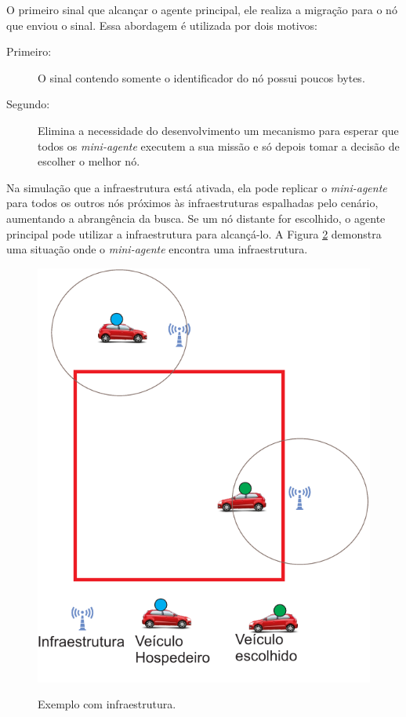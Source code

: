 \begin{figure}[htbp]
\begin{minipage}{0.50\textwidth}
		\label{fig:destinoVeiculoSelecionadoProximoRA}
	\end{minipage}
\end{figure}

O primeiro sinal que alcançar o agente principal, ele realiza a migração para o nó que enviou o sinal. Essa abordagem é utilizada por dois motivos:

\begin{description}
	\item[Primeiro:] O sinal contendo somente o identificador do nó possui poucos bytes.
	\item[Segundo:] Elimina a necessidade do desenvolvimento um mecanismo para esperar que todos os \emph{mini-agente} executem a sua missão e só depois tomar a decisão de escolher o melhor nó.
\end{description}

Na simulação que a infraestrutura está ativada, ela pode replicar o \emph{mini-agente} para todos os outros nós próximos 
às infraestruturas espalhadas pelo cenário, aumentando a abrangência da busca. Se um nó distante for escolhido, o agente principal pode utilizar a infraestrutura para alcançá-lo. A Figura \ref{fig:exemploComInfraestrutura} demonstra uma situação onde o \emph{mini-agente} encontra uma infraestrutura.

\begin{figure}[htbp]
	\centering
	\includegraphics[scale=0.5]{metodologia/figuras/exemploComInfraestrutura.pdf}
	\label{fig:exemploComInfraestrutura}
	\caption{Exemplo com infraestrutura.}
\end{figure}

